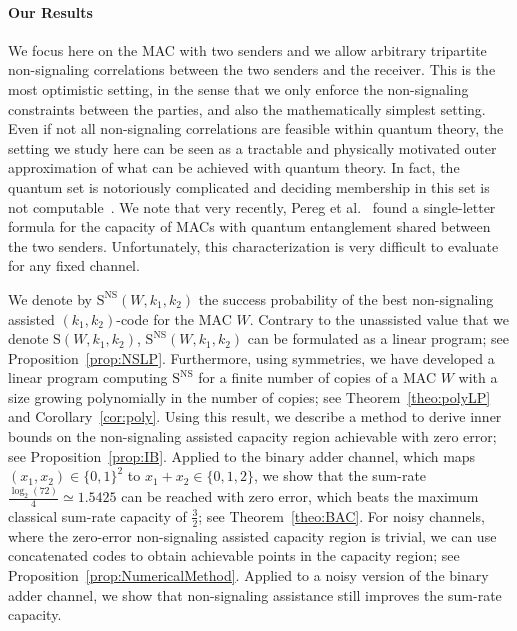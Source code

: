 \documentclass[11pt]{article}
\theoremstyle{definition}
\theoremstyle{remark}
\begin{document}
\paragraph{Our Results} We focus here on the MAC with two senders and we allow arbitrary tripartite non-signaling correlations between the two senders and the receiver. This is the most optimistic setting, in the sense that we only enforce the non-signaling constraints between the parties, and also the mathematically simplest setting. Even if not all non-signaling correlations are feasible within quantum theory, the setting we study here can be seen as a tractable and physically motivated outer approximation of what can be achieved with quantum theory. In fact, the quantum set is notoriously complicated and deciding membership in this set is not computable~\cite{JNWY20}. We note that very recently, Pereg et al.~\cite{PDB23} found a single-letter formula for the capacity of MACs with quantum entanglement shared between the two senders. Unfortunately, this characterization is very difficult to evaluate for any fixed channel.

We denote by $\mathrm{S}^{\mathrm{NS}}(W,k_1,k_2)$ the success probability of the best non-signaling assisted $(k_1,k_2)$-code for the MAC $W$. Contrary to the unassisted value that we denote $\mathrm{S}(W,k_1,k_2)$,  $\mathrm{S}^{\mathrm{NS}}(W,k_1,k_2)$ can be formulated as a linear program; see Proposition~\ref{prop:NSLP}. Furthermore, using symmetries, we have developed a linear program computing $\mathrm{S}^{\mathrm{NS}}$ for a finite number of copies of a MAC $W$ with a size growing polynomially in the number of copies; see Theorem~\ref{theo:polyLP} and Corollary~\ref{cor:poly}. Using this result, we describe a method to derive inner bounds on the non-signaling assisted capacity region achievable with zero error; see Proposition~\ref{prop:IB}. Applied to the binary adder channel, which maps $(x_1, x_2) \in \{0,1\}^2$ to $x_1 + x_2 \in \{0,1,2\}$, we show that the sum-rate $\frac{\log_2(72)}{4} \simeq 1.5425$ can be reached with zero error, which beats the maximum classical sum-rate capacity of $\frac{3}{2}$; see Theorem~\ref{theo:BAC}. For noisy channels, where the zero-error non-signaling assisted capacity region is trivial, we can use concatenated codes to obtain achievable points in the capacity region; see Proposition~\ref{prop:NumericalMethod}. Applied to a noisy version of the binary adder channel, we show that non-signaling assistance still improves the sum-rate capacity. 
\end{document}
